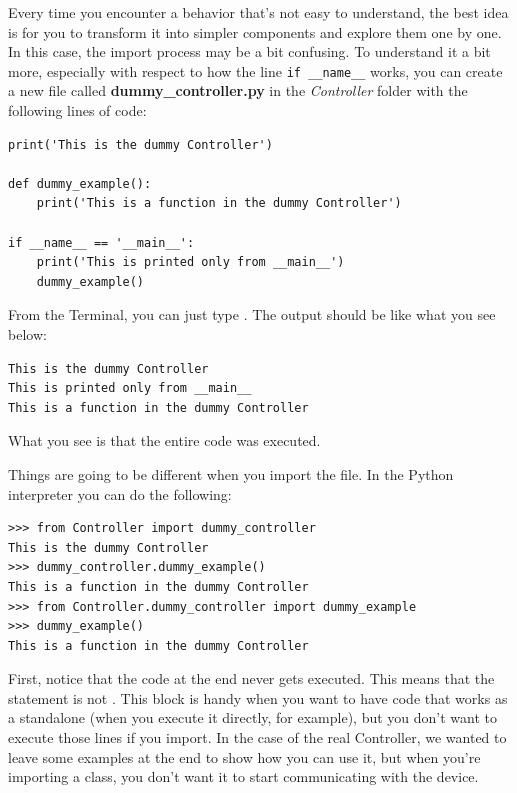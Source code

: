 Every time you encounter a behavior that's not easy to understand, the best idea is for you to transform it into simpler components and explore them one by one. In this case, the import process may be a bit confusing. To understand it a bit more, especially with respect to how the line \texttt{if __name__} works, you can create a new file called \textbf{dummy\_controller.py} in the \emph{Controller} folder with the following lines of code:

\begin{verbatim}
print('This is the dummy Controller')

def dummy_example():
    print('This is a function in the dummy Controller')

if __name__ == '__main__':
    print('This is printed only from __main__')
    dummy_example()

\end{verbatim}

\sloppy From the Terminal, you can just type . The output should be like what you see below:

\begin{verbatim}
This is the dummy Controller
This is printed only from __main__
This is a function in the dummy Controller
\end{verbatim}

What you see is that the entire code was executed.


Things are going to be different when you import the file. In the Python interpreter you can do the following:

\begin{verbatim}
>>> from Controller import dummy_controller
This is the dummy Controller
>>> dummy_controller.dummy_example()
This is a function in the dummy Controller
>>> from Controller.dummy_controller import dummy_example
>>> dummy_example()
This is a function in the dummy Controller
\end{verbatim}

First, notice that the code at the end never gets executed. This means that the  statement is not . This block is handy when you want to have code that works as a standalone (when you execute it directly, for example), but you don't want to execute those lines if you import. In the case of the real Controller, we wanted to leave some examples at the end to show how you can use it, but when you're importing a class, you don't want it to start communicating with the device.

